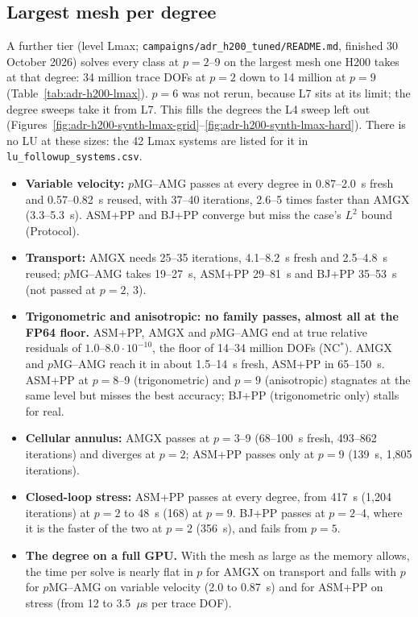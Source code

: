 \begin{table}[ht]
\centering\small

\caption{Closed-loop stress, orthogonal control, on the H200 (ms). P-LU rows: the genoa LU on
the same system, fresh/reused thread counts in the subscript.}
\label{tab:adr-h200-stress}
\end{table}

\subsection{Largest mesh per degree}
\label{sec:adr-h200-synth-lmax}

A further tier (level Lmax; \texttt{campaigns/adr\_h200\_tuned/README.md}, finished 30 October
2026) solves every class at $p=2$--9 on the largest mesh one H200 takes at that degree: 34
million trace DOFs at $p=2$ down to 14 million at $p=9$ (Table~\ref{tab:adr-h200-lmax}). $p=6$
was not rerun, because L7 sits at its limit; the degree sweeps take it from L7. This fills the
degrees the L4 sweep left out (Figures~\ref{fig:adr-h200-synth-lmax-grid}--\ref{fig:adr-h200-synth-lmax-hard}).
There is no LU at these sizes: the 42 Lmax systems are listed for it in
\texttt{lu\_followup\_systems.csv}.
\begin{itemize}
\item \textbf{Variable velocity:} $p$MG--AMG passes at every degree in 0.87--2.0~s fresh and
  0.57--0.82~s reused, with 37--40 iterations, 2.6--5 times faster than AMGX (3.3--5.3~s). ASM+PP
  and BJ+PP converge but miss the case's $L^2$ bound (Protocol).
\item \textbf{Transport:} AMGX needs 25--35 iterations, 4.1--8.2~s fresh and 2.5--4.8~s reused;
  $p$MG--AMG takes 19--27~s, ASM+PP 29--81~s and BJ+PP 35--53~s (not passed at $p=2$, 3).
\item \textbf{Trigonometric and anisotropic: no family passes, almost all at the FP64 floor.}
  ASM+PP, AMGX and $p$MG--AMG end at true relative residuals of $1.0$--$8.0\cdot10^{-10}$, the
  floor of 14--34 million DOFs (NC$^*$). AMGX and $p$MG--AMG reach it in about 1.5--14~s fresh,
  ASM+PP in 65--150~s. ASM+PP at $p=8$--9 (trigonometric) and $p=9$ (anisotropic) stagnates at
  the same level but misses the best accuracy; BJ+PP (trigonometric only) stalls for real.
\item \textbf{Cellular annulus:} AMGX passes at $p=3$--9 (68--100~s fresh, 493--862 iterations)
  and diverges at $p=2$; ASM+PP passes only at $p=9$ (139~s, 1{,}805 iterations).
\item \textbf{Closed-loop stress:} ASM+PP passes at every degree, from 417~s (1{,}204 iterations)
  at $p=2$ to 48~s (168) at $p=9$. BJ+PP passes at $p=2$--4, where it is the faster of the two
  at $p=2$ (356~s), and fails from $p=5$.
\item \textbf{The degree on a full GPU.} With the mesh as large as the memory allows, the time
  per solve is nearly flat in $p$ for AMGX on transport and falls with $p$ for $p$MG--AMG on
  variable velocity (2.0 to 0.87~s) and for ASM+PP on stress (from 12 to 3.5~$\mu$s per trace
  DOF).
\end{itemize}

